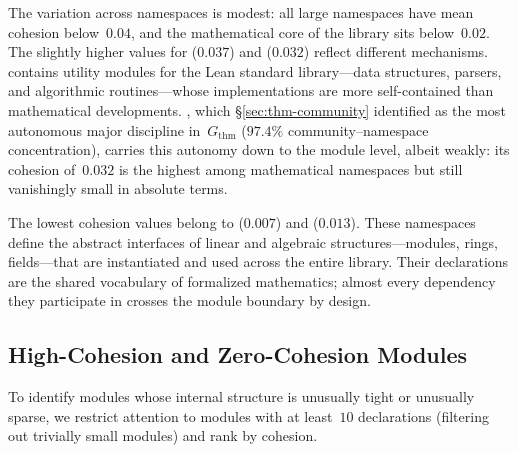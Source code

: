 The variation across namespaces is modest: all large namespaces have mean cohesion below~$0.04$, and the mathematical core of the library sits below~$0.02$. The slightly higher values for  ($0.037$) and  ($0.032$) reflect different mechanisms.  contains utility modules for the Lean standard library---data structures, parsers, and algorithmic routines---whose implementations are more self-contained than mathematical developments. , which \S\ref{sec:thm-community} identified as the most autonomous major discipline in~$G_{\mathrm{thm}}$ ($97.4\%$ community--namespace concentration), carries this autonomy down to the module level, albeit weakly: its cohesion of~$0.032$ is the highest among mathematical namespaces but still vanishingly small in absolute terms.

The lowest cohesion values belong to  ($0.007$) and  ($0.013$). These namespaces define the abstract interfaces of linear and algebraic structures---modules, rings, fields---that are instantiated and used across the entire library. Their declarations are the shared vocabulary of formalized mathematics; almost every dependency they participate in crosses the module boundary by design.

\subsection{High-Cohesion and Zero-Cohesion Modules}
\label{sec:cohesion-extremes}

To identify modules whose internal structure is unusually tight or unusually sparse, we restrict attention to modules with at least~$10$ declarations (filtering out trivially small modules) and rank by cohesion.


